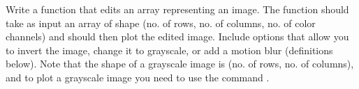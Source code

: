 %
%
%

\begin{problem}
Write a function that edits an array representing an image. The function should take as input
an array of shape (no. of rows, no. of columns, no. of color channels) and should then plot the edited
image. Include options that allow you to  invert the image, change it to grayscale, or add a motion blur (definitions below).
Note that the shape of a grayscale image is (no. of rows, no. of columns), and to plot a
grayscale image  you need to use the command .
\end{problem}

